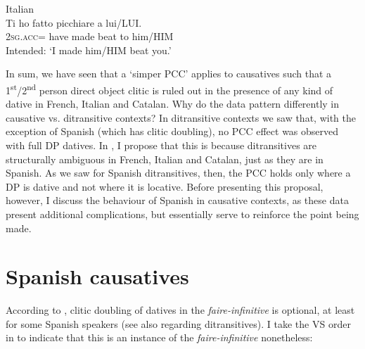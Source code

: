 \documentclass[output=paper,colorlinks,citecolor=brown,nonflat]{./langscibook}
\begin{document}
\ea%
    \label{ex:sheehan:28}
    Italian\footnotemark{}\\
    \gll    *Ti ho        fatto   picchiare   a    lui/LUI.\\
            2\textsc{sg.acc}= have   made   beat     to him/HIM\\
    \glt    Intended: ‘I made him/HIM beat you.’
\z
{}

In sum, we have seen that a ‘simper PCC’ applies to causatives such that a 1\textsuperscript{st}/2\textsuperscript{nd} person direct object clitic is ruled out in the presence of any kind of dative in French, Italian and Catalan. Why do the data pattern differently in causative vs. ditransitive contexts? In ditransitive contexts we saw that, with the exception of Spanish (which has clitic doubling), no PCC effect was observed with full DP datives. In , I propose that this is because ditransitives are structurally ambiguous in French, Italian and Catalan, just as they are in Spanish. As we saw for Spanish ditransitives, then, the PCC holds only where a DP is dative and not where it is locative. Before presenting this proposal, however, I discuss the behaviour of Spanish in causative contexts, as these data present additional complications, but essentially serve to reinforce the point being made. 

\section{Spanish causatives}\label{sec:sheehan:4}

According to \citet{Torrego2010}, clitic doubling of datives in the \textit{faire-infinitive} is optional, at least for some Spanish speakers (see also \citealt{Pineda2013} regarding ditransitives). I take the VS order in  to indicate that this is an instance of the \textit{faire-infinitive} nonetheless:
\end{document}

